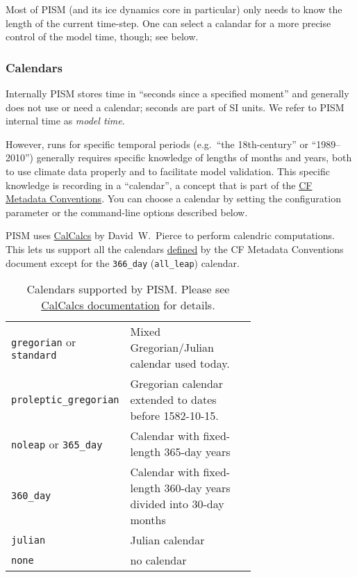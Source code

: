 Most of PISM (and its ice dynamics core in particular) only needs to know the length of the current time-step. One can select a calandar for a more precise control of the model time, though; see below.

\subsubsection{Calendars}
\label{sec:calendars}

Internally PISM stores time in ``seconds since a specified moment'' and
generally does not use or need a calendar; seconds are part of SI units.
We refer to PISM internal time as \emph{model time}.

However, runs for specific temporal periods (e.g.~``the 18th-century'' or
``1989--2010'') generally requires specific knowledge of lengths of months
and years, both to use climate data properly and to facilitate model validation.
This specific knowledge is recording in a ``calendar'', a concept that
is part of the \href{http://cf-pcmdi.llnl.gov/documents/cf-conventions/1.6/cf-conventions.html}{CF Metadata Conventions}.
You can choose a calendar by setting the  configuration
parameter or the command-line options described below.

PISM uses
\href{http://meteora.ucsd.edu/~pierce/calcalcs/index.html}{CalCalcs}
by David~W.~Pierce to perform calendric computations. This lets us
support all the calendars
\href{http://cf-pcmdi.llnl.gov/documents/cf-conventions/1.6/cf-conventions.html#calendar}{defined}
by the CF Metadata Conventions document except for the
\texttt{366_day} (\texttt{all_leap}) calendar.

\begin{table}
  \centering
  \begin{tabular}{lp{0.7\linewidth}}
    \texttt{gregorian} or \texttt{standard} & Mixed Gregorian/Julian calendar used today.\\
    \texttt{proleptic_gregorian} & Gregorian calendar extended to dates before 1582-10-15.\\
    \texttt{noleap} or \texttt{365_day} & Calendar with fixed-length 365-day years\\
    \texttt{360_day} & Calendar with fixed-length 360-day years divided into 30-day months\\
    \texttt{julian} & Julian calendar \\
    \texttt{none} & no calendar\\
  \end{tabular}
  \caption{Calendars supported by PISM. Please see \href{http://meteora.ucsd.edu/~pierce/calcalcs/calendars.html}{CalCalcs documentation} for details.}
  \label{tab:calendars}
\end{table}

